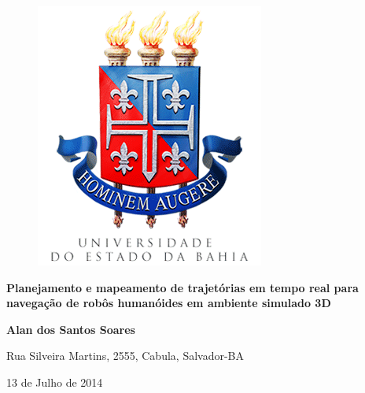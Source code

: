 \documentclass[font=plain]{abnt}
\begin{document}
    
    \begin{center}
      
	
	\begin{figure}[H]
	    \centering
	    \includegraphics[scale=0.3]{figuras/logouneb.png}
	\end{figure}

      
      	\begin{center}
	\end{center}
      	
	\vspace*{3 cm}

	\begin{center}
	 \sf\Large\textbf{Planejamento e mapeamento de trajetórias em tempo real para navegação de robôs humanóides em ambiente simulado 3D}
	\end{center}
	
	\vspace*{3 cm}

	{\large \textbf{Alan dos Santos Soares}}

	\begin{center}
	\vspace*{\fill}
	Rua Silveira Martins, 2555, Cabula, Salvador-BA
	\par
	13 de Julho de 2014
	\vspace*{1cm}
	\end{center}
      
    \end{center}
    
\end{document}
